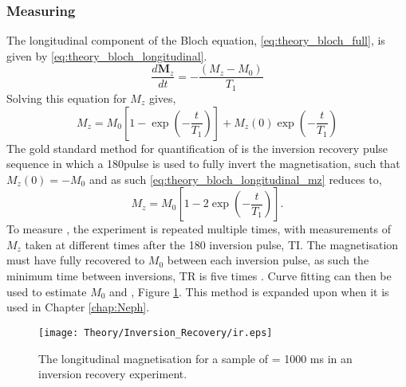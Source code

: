 \subsubsection{Measuring \tone}
The longitudinal component of the Bloch equation, \eqref{eq:theory_bloch_full}, is given by \eqref{eq:theory_bloch_longitudinal}.
\begin{equation}
\frac{d\mathbf{M}_z}{dt} = - \frac{\left( M_z - M_0 \right)}{T_1}
\label{eq:theory_bloch_longitudinal}
\end{equation}
Solving this equation for $M_z$ gives,
\begin{equation}
M_z = M_0 \left[1 - \exp\left(-\frac{t}{T_1}\right) \right] + M_z\left( 0 \right) \exp \left(-\frac{t}{T_1}\right) 
\label{eq:theory_bloch_longitudinal_mz}
\end{equation}
The gold standard method for quantification of \tone is the inversion recovery pulse sequence in which a 180\degree{ }pulse is used to fully invert the magnetisation, such that $M_z(0) = -M_0$ and as such \eqref{eq:theory_bloch_longitudinal_mz} reduces to,
\begin{equation}
M_z = M_0 \left[1 - 2\exp\left(-\frac{t}{T_1}\right) \right].
\label{eq:theory_bloch_longitudinal_mz_inversion}
\end{equation}
To measure \tone, the experiment is repeated multiple times, with measurements of $M_z$ taken at different times after the 180\degree{ } inversion pulse, \ac{TI}. The magnetisation must have fully recovered to $M_0$ between each inversion pulse, as such the minimum time between inversions, \ac{TR} is five times \tone. Curve fitting can then be used to estimate $M_0$ and \tone, Figure \ref{fig:theory_inversion_recovery}.
This method is expanded upon when it is used in Chapter \ref{chap:Neph}.

\begin{figure}[H]
	\centering
	\texttt{[image: Theory/Inversion\_Recovery/ir.eps]}
	\caption{The longitudinal magnetisation for a sample of \tone = 1000 ms in an inversion recovery experiment.}
	\label{fig:theory_inversion_recovery}	
\end{figure}
